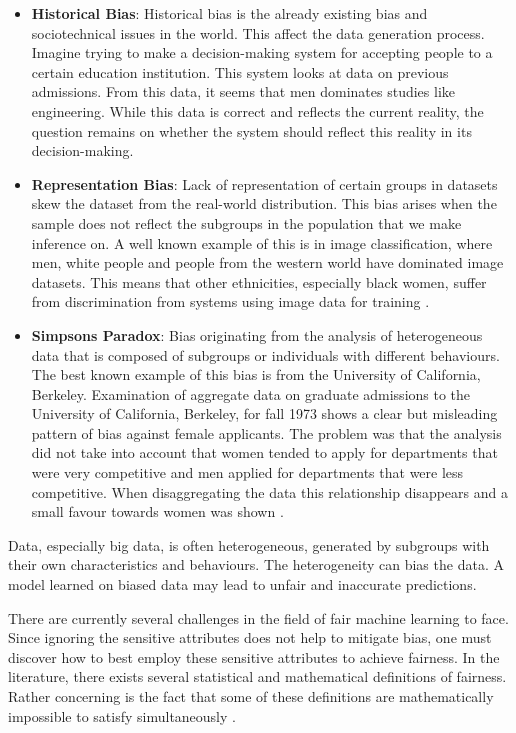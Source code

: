 \begin{itemize}
    \item \textbf{Historical Bias}: Historical bias is the already existing bias and sociotechnical issues in the world. This affect the data generation process. Imagine trying to make a decision-making system for accepting people to a certain education institution. This system looks at data on previous admissions. From this data, it seems that men dominates studies like engineering. While this data is correct and reflects the current reality, the question remains on whether the system should reflect this reality in its decision-making.

    \item \textbf{Representation Bias}: Lack of representation of certain groups in datasets skew the dataset from the real-world distribution. This bias arises when the sample does not reflect the subgroups in the population that we make inference on. A well known example of this is in image classification, where men, white people and people from the western world have dominated image datasets. This means that other ethnicities, especially black women, suffer from discrimination from systems using image data for training \cite{Walsh:2022:ACM}.

    \item \textbf{Simpsons Paradox}: Bias originating from the analysis of heterogeneous data that is composed of subgroups or individuals with different behaviours. The best known example of this bias is from the University of California, Berkeley. Examination of aggregate data on graduate admissions to the University of California, Berkeley, for fall 1973 shows a clear but misleading pattern of bias against female applicants. The problem was that the analysis did not take into account that women tended to apply for departments that were very competitive and men applied for departments that were less competitive. When disaggregating the data this relationship disappears and a small favour towards women was shown \cite{Bickel:1975:Science}.
\end{itemize}

Data, especially big data, is often heterogeneous, generated by subgroups with their own characteristics and behaviours. The heterogeneity can bias the data. A model learned on biased data may lead to unfair and inaccurate predictions.

There are currently several challenges in the field of fair machine learning to face. Since ignoring the sensitive attributes does not help to mitigate bias, one must discover how to best employ these sensitive attributes to achieve fairness. In the literature, there exists several statistical and mathematical definitions of fairness. Rather concerning is the fact that some of these definitions are mathematically impossible to satisfy simultaneously \citep{Kleinberg:2017:LIPIcs}.

